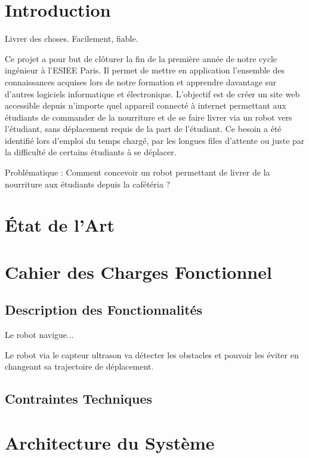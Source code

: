 \documentclass[a4paper,12pt]{report}  %
\begin{document}
	\section{Introduction}
	Livrer des choses. Facilement, fiable.

	Ce projet a pour but de clôturer la fin de la première année de notre cycle ingénieur à 
	l'ESIEE Paris. Il permet de mettre en application l'ensemble des connaissances acquises 
	lors de notre formation et apprendre davantage sur d'autres logiciels informatique et 
	électronique.
	L'objectif est de créer un site web accessible depuis n'importe quel appareil connecté 
	à internet permettant aux étudiants de commander de la nourriture et de se faire livrer 
	via un robot vers l'étudiant, sans déplacement requis de la part de l'étudiant.
	Ce besoin a été identifié lors d'emploi du temps chargé, par les longues files 
	d'attente ou juste par la difficulté de certains étudiants à se déplacer.

	Problématique : Comment concevoir un robot permettant de livrer de la nourriture 
	aux étudiants depuis la cafétéria ?
	
	\section{État de l'Art}

	\section{Cahier des Charges Fonctionnel}
	\subsection{Description des Fonctionnalités}
	Le robot navigue...

	Le robot via le capteur ultrason va détecter les obstacles et pouvoir les éviter en 
	changeant sa trajectoire de déplacement.
	
	\subsection{Contraintes Techniques}
	
	\section{Architecture du Système}
\end{document}
